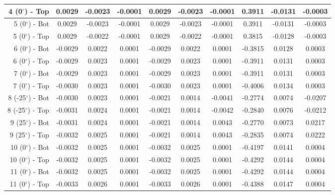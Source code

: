\begin{table}[H]
\begin{longtable}{rccccccccc}
4 (0$^\circ$) - Top   &        0.0029 &       -0.0023 &       -0.0001 &        0.0029 &       -0.0023 &       -0.0001 &      0.3911 &     -0.0131 &     -0.0003 \\ \midrule
5 (0$^\circ$) - Bot   &        0.0029 &       -0.0023 &       -0.0001 &        0.0029 &       -0.0023 &       -0.0001 &      0.3911 &     -0.0131 &     -0.0003 \\
5 (0$^\circ$) - Top   &        0.0029 &       -0.0022 &       -0.0001 &        0.0029 &       -0.0022 &       -0.0001 &      0.3815 &     -0.0128 &     -0.0003 \\ \midrule
6 (0$^\circ$) - Bot   &       -0.0029 &        0.0022 &        0.0001 &       -0.0029 &        0.0022 &        0.0001 &     -0.3815 &      0.0128 &      0.0003 \\
6 (0$^\circ$) - Top   &       -0.0029 &        0.0023 &        0.0001 &       -0.0029 &        0.0023 &        0.0001 &     -0.3911 &      0.0131 &      0.0003 \\ \midrule
7 (0$^\circ$) - Bot   &       -0.0029 &        0.0023 &        0.0001 &       -0.0029 &        0.0023 &        0.0001 &     -0.3911 &      0.0131 &      0.0003 \\
7 (0$^\circ$) - Top   &       -0.0030 &        0.0023 &        0.0001 &       -0.0030 &        0.0023 &        0.0001 &     -0.4006 &      0.0134 &      0.0003 \\ \midrule
8 (-25$^\circ$) - Bot &       -0.0030 &        0.0023 &        0.0001 &       -0.0021 &        0.0014 &       -0.0041 &     -0.2774 &      0.0074 &     -0.0207 \\
8 (-25$^\circ$) - Top &       -0.0031 &        0.0024 &        0.0001 &       -0.0021 &        0.0014 &       -0.0042 &     -0.2840 &      0.0076 &     -0.0212 \\ \midrule
9 (25$^\circ$) - Bot  &       -0.0031 &        0.0024 &        0.0001 &       -0.0021 &        0.0014 &        0.0043 &     -0.2770 &      0.0073 &      0.0217 \\
9 (25$^\circ$) - Top  &       -0.0032 &        0.0025 &        0.0001 &       -0.0021 &        0.0014 &        0.0043 &     -0.2835 &      0.0074 &      0.0222 \\ \midrule
10 (0$^\circ$) - Bot  &       -0.0032 &        0.0025 &        0.0001 &       -0.0032 &        0.0025 &        0.0001 &     -0.4197 &      0.0141 &      0.0004 \\
10 (0$^\circ$) - Top  &       -0.0032 &        0.0025 &        0.0001 &       -0.0032 &        0.0025 &        0.0001 &     -0.4292 &      0.0144 &      0.0004 \\ \midrule
11 (0$^\circ$) - Bot  &       -0.0032 &        0.0025 &        0.0001 &       -0.0032 &        0.0025 &        0.0001 &     -0.4292 &      0.0144 &      0.0004 \\
11 (0$^\circ$) - Top  &       -0.0033 &        0.0026 &        0.0001 &       -0.0033 &        0.0026 &        0.0001 &     -0.4388 &      0.0147 &      0.0004 \\
\end{longtable}
\end{table}